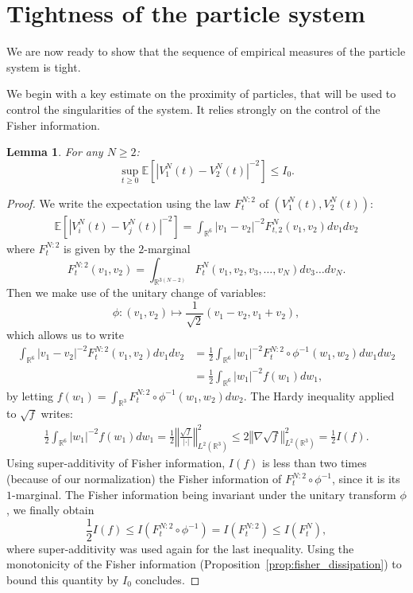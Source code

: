 \documentclass[11pt,a4paper]{article}
\theoremstyle{definition}
\theoremstyle{plain}
\newtheorem{lemma}[defi]{Lemma}
\begin{document}
\section{Tightness of the particle system}
\label{sec:tightness}
We are now ready to show that the sequence of empirical measures of the particle system is tight.

We begin with a key estimate on the proximity of particles, that will be used to control the singularities of the system. It relies strongly on the control of the Fisher information.
\begin{lemma}
\label{lem:keyestimate}
    For any $N\geq 2$:
    $$\sup_{t\geq 0} \mathbb{E}\left[ \left\vert V^N_1(t) - V^N_2(t)\right\vert^{-2} \right] \leq I_0.$$
\end{lemma}
\begin{proof}
    We write the expectation using the law $F_{t}^{N:2}$ of $(V^N_1(t),V^N_2(t))$:
    \begin{align}
        \mathbb{E}\left[ \left\vert V^N_i(t) - V^N_j(t)\right\vert^{-2} \right] = \int_{\mathbb{R}^6}\left\vert v_1 - v_2\right\vert^{-2}F_{t,2}^N(v_1,v_2)dv_1dv_2
    \end{align}
    where $F_{t}^{N:2}$ is given by the $2$-marginal $$F_{t}^{N:2}(v_1,v_2) = \int_{\mathbb{R}^{3(N-2)}}F^N_t(v_1,v_2,v_3,\ldots,v_N)dv_3 \ldots dv_N.$$
    Then we make use of the unitary change of variables:
    $$\phi: (v_1,v_2) \mapsto \frac{1}{\sqrt{2}}(v_1-v_2,v_1+v_2),$$ which allows us to write
    \begin{align*}
         \int_{\mathbb{R}^6}\left\vert v_1 - v_2\right\vert^{-2}F_{t}^{N:2}(v_1,v_2)dv_1dv_2& = \frac{1}{2}\int_{\mathbb{R}^6}\left\vert w_1\right\vert^{-2}F_{t}^{N:2}\circ \phi^{-1}(w_1,w_2)dw_1dw_2 \\&= \frac{1}{2}\int_{\mathbb{R}^6}\left\vert w_1\right\vert^{-2}f(w_1)dw_1,
    \end{align*}
    by letting $f(w_1) = \int_{\mathbb{R}^3} F_{t}^{N:2}\circ \phi^{-1}(w_1,w_2)dw_2$.
    The Hardy inequality applied to $\sqrt{f}$ writes:
    \begin{align*}
        \frac{1}{2}\int_{\mathbb{R}^6}\left\vert w_1\right\vert^{-2}f(w_1)dw_1 = \frac{1}{2}\left\Vert \frac{\sqrt{f}}{\vert\cdot\vert}\right\Vert_{L^2(\mathbb{R}^3)}^2\leq 2 \left\Vert \nabla \sqrt{f}\right\Vert_{L^2(\mathbb{R}^3)}^2 = \frac{1}{2}I(f).
    \end{align*}
    Using super-additivity of Fisher information, $I(f)$ is less than two times (because of our normalization) the Fisher information of $F_{t}^{N:2}\circ \phi^{-1}$, since it is its $1$-marginal. The Fisher information being invariant under the unitary transform $\phi$, we finally obtain
    $$\frac{1}{2}I(f) \leq I(F_{t}^{N:2}\circ \phi^{-1}) = I(F_{t}^{N:2}) \leq  I(F^N_t),$$
    where super-additivity was used again for the last inequality.
    Using the monotonicity of the Fisher information (Proposition~\ref{prop:fisher_dissipation}) to bound this quantity by $I_0$ concludes.
\end{proof}
\end{document}
